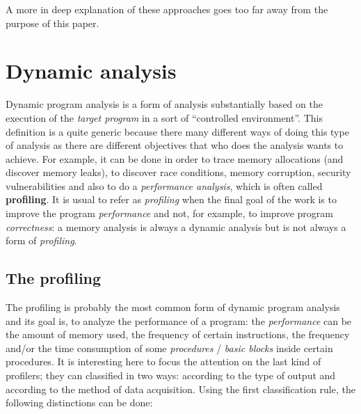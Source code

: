 \documentclass[a4paper,11pt]{report}
\begin{document}
A more in deep explanation of these approaches goes too far away from the purpose of this paper.

\section{Dynamic analysis}

Dynamic program analysis is a form of analysis substantially based on the execution of the \emph{target program} in a sort of ``controlled environment''.
This definition is a quite generic because there many different ways of doing
this type of analysis as there are different objectives that who does the
analysis wants to achieve. For example, it can be done in order to trace memory
allocations (and discover memory leaks), to discover race conditions, memory
corruption, security vulnerabilities and also to do a \emph{performance
analysis}, which is often called \textbf{profiling}. It is usual to refer as \emph{profiling} when
the final goal of the work is to improve the program  \emph{performance} and
not, for example, to improve program \emph{correctness}: a memory analysis
is always a dynamic analysis but is not always a form of \emph{profiling}.

\subsection{The profiling}
The profiling is probably the most common form of dynamic program analysis and
its goal is, to analyze the performance of a program: the
\emph{performance} can be the amount of memory used, the frequency of certain
instructions, the frequency and/or the time consumption of some
\emph{procedures} / \emph{basic blocks} inside certain procedures. 
It is interesting here to focus the attention on the last kind of profilers; 
they can classified in two ways: according to the type of output and according to the method of data acquisition. Using the first classification rule, the following distinctions can be done:
\end{document}
